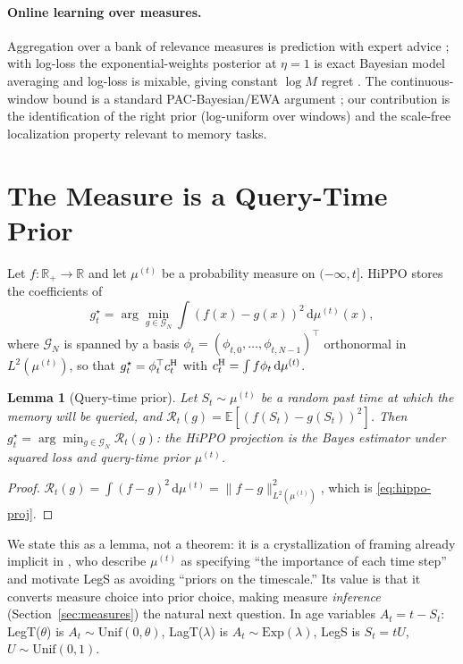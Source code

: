 \documentclass[11pt]{article}
\newtheorem{lemma}{Lemma}
\newcommand{\R}{\mathbb{R}}
\newcommand{\E}{\mathbb{E}}
\newcommand{\G}{\mathcal{G}}
\newcommand{\dd}{\,\mathrm{d}}
\newcommand{\mut}{\mu^{(t)}}
\begin{document}
\paragraph{Online learning over measures.} Aggregation over a bank of relevance measures is prediction with expert advice \citep{cesa2006prediction}; with log-loss the exponential-weights posterior at $\eta=1$ is exact Bayesian model averaging and log-loss is mixable, giving constant $\log M$ regret \citep{vovk1998mixability}. The continuous-window bound is a standard PAC-Bayesian/EWA argument \citep{mcallester1999pac}; our contribution is the identification of the right prior (log-uniform over windows) and the scale-free localization property relevant to memory tasks.

\section{The Measure is a Query-Time Prior}\label{sec:framing}

Let $f:\R_+\to\R$ and let $\mut$ be a probability measure on $(-\infty,t]$. HiPPO stores the coefficients of
\begin{equation}
    g_t^\star=\arg\min_{g\in\G_N}\int(f(x)-g(x))^2\dd\mut(x),
    \label{eq:hippo-proj}
\end{equation}
where $\G_N$ is spanned by a basis $\phi_t=(\phi_{t,0},\dots,\phi_{t,N-1})^\top$ orthonormal in $L^2(\mut)$, so that $g_t^\star=\phi_t^\top c_t^{\rm H}$ with $c_t^{\rm H}=\int f\phi_t\dd\mut$.

\begin{lemma}[Query-time prior]\label{lem:query}
Let $S_t\sim\mut$ be a random past time at which the memory will be queried, and $\mathcal R_t(g)=\E[(f(S_t)-g(S_t))^2]$. Then $g_t^\star=\arg\min_{g\in\G_N}\mathcal R_t(g)$: the HiPPO projection is the Bayes estimator under squared loss and query-time prior $\mut$.
\end{lemma}
\begin{proof}
$\mathcal R_t(g)=\int(f-g)^2\dd\mut=\|f-g\|^2_{L^2(\mut)}$, which is \eqref{eq:hippo-proj}.
\end{proof}

We state this as a lemma, not a theorem: it is a crystallization of framing already implicit in \citet{gu2020hippo}, who describe $\mut$ as specifying ``the importance of each time step'' and motivate LegS as avoiding ``priors on the timescale.'' Its value is that it converts measure choice into prior choice, making measure \emph{inference} (Section~\ref{sec:measures}) the natural next question. In age variables $A_t=t-S_t$: LegT($\theta$) is $A_t\sim\mathrm{Unif}(0,\theta)$, LagT($\lambda$) is $A_t\sim\mathrm{Exp}(\lambda)$, LegS is $S_t=tU$, $U\sim\mathrm{Unif}(0,1)$.
\end{document}
